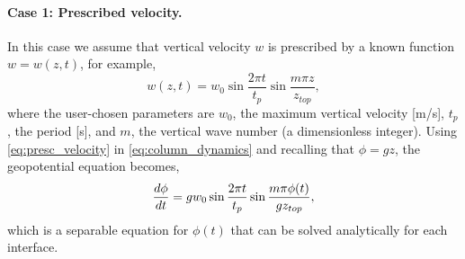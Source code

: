 \paragraph{Case 1: Prescribed velocity.} In this case we assume that vertical velocity $w$ is prescribed by a known function $w=w(z,t)$, for example,
\begin{equation}\label{eq:presc_velocity}
  w(z,t) = w_0 \sin \frac{2\pi t}{t_p}\sin \frac{m \pi z}{z_{top}},
\end{equation}
where the user-chosen parameters are $w_0$, the maximum vertical velocity [m/s], $t_p$, the period [s], and $m$, the vertical wave number (a dimensionless integer).
Using \eqref{eq:presc_velocity} in \eqref{eq:column_dynamics} and recalling that $\phi = gz$, the geopotential equation becomes,
\begin{equation}
  \frac{ d \phi}{d t} = gw_0\sin\frac{2\pi t}{t_p}\sin\frac{m\pi \phi(t)}{g z_{top}},
\end{equation}
which is a separable equation for $\phi(t)$ that can be solved analytically for each interface.
